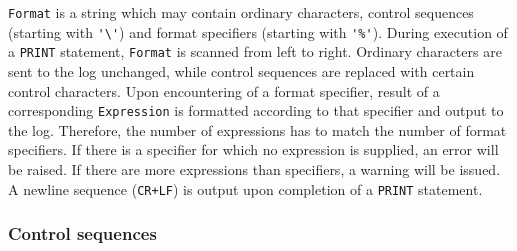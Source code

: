 \verb'Format' is a string which may contain ordinary characters, control
sequences (starting with \verb"'\'") and format specifiers (starting with \verb"'%'").
During execution of a \verb'PRINT' statement, \verb'Format' is scanned from left
to right. Ordinary characters are sent to the log unchanged, while control
sequences are replaced with certain control characters.
Upon encountering of a format specifier, result of a corresponding
\verb'Expression' is formatted according to that specifier and output
to the log. Therefore, the number of expressions has to match the
number of format specifiers. If there is a specifier for which no
expression is supplied, an error will be raised. If there are more expressions
than specifiers, a warning will be issued. A newline sequence (\verb'CR+LF')
is output upon completion of a \verb'PRINT' statement.



\subsubsection{Control sequences}


